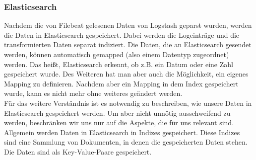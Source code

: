 \subsubsection{Elasticsearch}
\label{ssub:Elasticsearch}
Nachdem die von Filebeat gelesenen Daten von Logstash geparst wurden, werden die Daten in Elasticsearch gespeichert. Dabei werden die Logeinträge und die transformierten Daten separat indiziert. Die Daten, die an Elasticsearch gesendet werden, können automatisch gemapped (also einem Datentyp zugeordnet) werden. Das heißt, Elasticsearch erkennt, ob z.B. ein Datum oder eine Zahl gespeichert wurde. Des Weiteren hat man aber auch die Möglichkeit, ein eigenes Mapping zu definieren. Nachdem aber ein Mapping in dem Index gespeichert wurde, kann es nicht mehr ohne weiteres geändert werden.\\
Für das weitere Verständnis ist es notwendig zu beschreiben, wie unsere Daten in Elasticsearch gespeichert werden. Um aber nicht unnötig ausschweifend zu werden, beschränken wir uns nur auf die Aspekte, die für uns relevant sind.\\
Allgemein werden Daten in Elasticsearch in Indizes gespeichert. Diese Indizes sind eine Sammlung von Dokumenten, in denen die gespeicherten Daten stehen. Die Daten sind als Key-Value-Paare gespeichert. 
